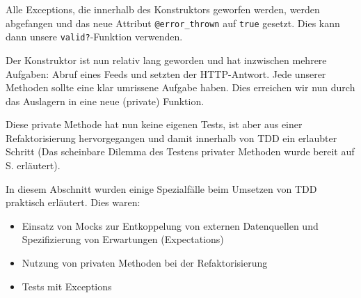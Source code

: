 \tddgreen
Alle Exceptions, die innerhalb des Konstruktors geworfen werden, werden abgefangen und das neue Attribut \texttt{@error\_thrown} auf \texttt{true} gesetzt. Dies kann dann unsere \texttt{valid?}-Funktion verwenden.

\tddrefactor

Der Konstruktor ist nun relativ lang geworden und hat inzwischen mehrere Aufgaben: Abruf eines Feeds und setzten der HTTP-Antwort. Jede unserer Methoden sollte eine klar umrissene Aufgabe haben. Dies erreichen wir nun durch das Auslagern in eine neue (private) Funktion.

\begin{ruby}[label=lib/imported\_job.rb]
 
    
    
      
     
      
   
          

   
      
      
      
\end{ruby}

Diese private Methode hat nun keine eigenen Tests, ist aber aus einer Refaktorisierung hervorgegangen und damit innerhalb von TDD ein erlaubter Schritt (Das scheinbare Dilemma des Testens privater Methoden wurde bereit auf S. \pageref{sec:tddspecialcircumstances} erläutert).


In diesem Abschnitt wurden einige Spezialfälle beim Umsetzen von TDD praktisch erläutert. Dies waren:
\begin{itemize}
 \item Einsatz von Mocks zur Entkoppelung von externen Datenquellen und Spezifizierung von Erwartungen (Expectations)
 \item Nutzung von privaten Methoden bei der Refaktorisierung
 \item Tests mit Exceptions
\end{itemize}
